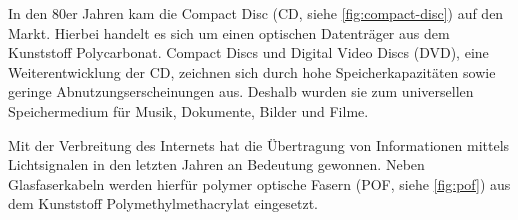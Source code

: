 In den 80er Jahren kam die Compact Disc (CD, siehe \autoref{fig:compact-disc})
auf den Markt. Hierbei handelt es sich um einen optischen Datenträger aus dem
Kunststoff Polycarbonat. Compact Discs und Digital Video Discs (DVD), eine
Weiterentwicklung der CD, zeichnen sich durch hohe Speicherkapazitäten sowie
geringe Abnutzungserscheinungen aus. Deshalb wurden sie zum universellen
Speichermedium für Musik, Dokumente, Bilder und Filme.

Mit der Verbreitung des Internets hat die Übertragung von Informationen mittels
Lichtsignalen in den letzten Jahren an Bedeutung gewonnen. Neben Glasfaserkabeln
werden hierfür polymer optische Fasern (POF, siehe \autoref{fig:pof}) aus dem
Kunststoff Polymethylmethacrylat eingesetzt.

